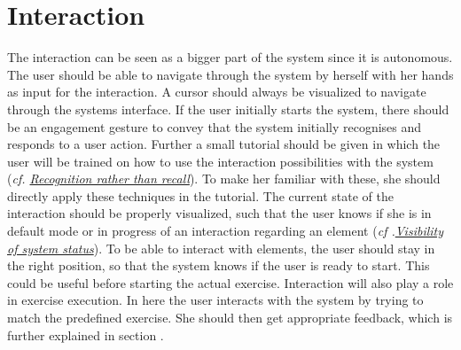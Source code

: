 \section{Interaction}\label{4_2_interaction}
The interaction can be seen as a bigger part of the system since it is autonomous. The user should be able to navigate through the system by herself with her hands as input for the interaction. A cursor should always be visualized to navigate through the systems interface. If the user initially starts the system, there should be an engagement gesture to convey that the system initially recognises and responds to a user action. Further a small tutorial should be given in which the user will be trained on how to use the interaction possibilities with the system (\textit{cf. \hyperref[nielsenDesignPrinciples]{Recognition rather than recall}}). To make her familiar with these, she should directly apply these techniques in the tutorial. The current state of the interaction should be properly visualized, such that the user knows if she is in default mode or in progress of an interaction regarding an element (\textit{cf .\hyperref[nielsenDesignPrinciples]{Visibility of system status}}). To be able to interact with elements, the user should stay in the right position, so that the system knows if the user is ready to start. This could be useful before starting the actual exercise. Interaction will also play a role in exercise execution. In here the user interacts with the system by trying to match the predefined exercise. She should then get appropriate feedback, which is further explained in section \textit{}.

\begin{comment}
- user can and should interact with the system
\\- Cursor visualization as hand image
\\- Engagement gesture for first interaction with Kinect (One hand over shoulder)
\\- She should be instructed how to interact 
\\- Different interaction methods should be provided to prevent failing on one (tutorial --> clicking (variations) + scrolling)
\end{comment}